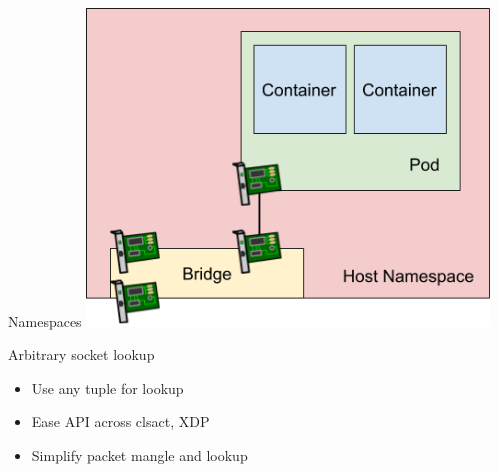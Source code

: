 \documentclass[black,white]{beamer}
\begin{document}
    \begin{frame}[fragile]{Namespaces}
        \vfill
        \centering
        \includegraphics[width=0.8\textwidth]{sk-lookup-netns.png}
        \vfill
    \end{frame}

    \begin{frame}{Arbitrary socket lookup}
        \begin{itemize}
            \item Use any tuple for lookup \bigskip
            \item Ease API across clsact, XDP \bigskip
            \item Simplify packet mangle and lookup \bigskip
        \end{itemize}
    \end{frame}
\end{document}
